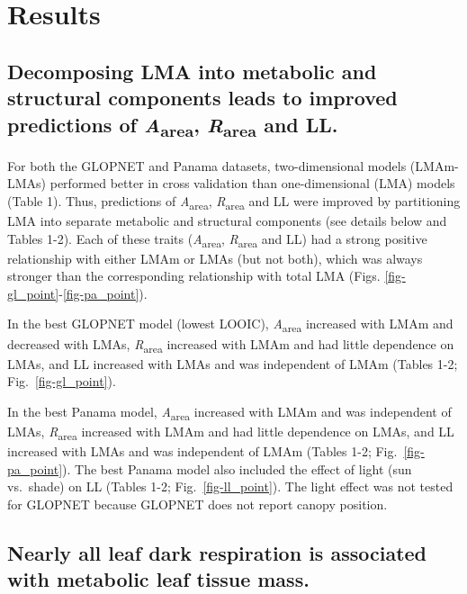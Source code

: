 \documentclass[
  12pt,
  letterpaper,
  DIV=11,
  numbers=noendperiod]{scrartcl}
\begin{document}
\section{Results}\label{results}

\subsection{\texorpdfstring{Decomposing LMA into metabolic and
structural components leads to improved predictions of
\emph{A}\textsubscript{area}, \emph{R}\textsubscript{area} and
LL.}{Decomposing LMA into metabolic and structural components leads to improved predictions of Aarea, Rarea and LL.}}\label{decomposing-lma-into-metabolic-and-structural-components-leads-to-improved-predictions-of-aarea-rarea-and-ll.}

For both the GLOPNET and Panama datasets, two-dimensional models
(LMAm-LMAs) performed better in cross validation than one-dimensional
(LMA) models (Table 1). Thus, predictions of
\emph{A}\textsubscript{area}, \emph{R}\textsubscript{area} and LL were
improved by partitioning LMA into separate metabolic and structural
components (see details below and Tables 1-2). Each of these traits
(\emph{A}\textsubscript{area}, \emph{R}\textsubscript{area} and LL) had
a strong positive relationship with either LMAm or LMAs (but not both),
which was always stronger than the corresponding relationship with total
LMA (Figs. \ref{fig-gl_point}-\ref{fig-pa_point}).

In the best GLOPNET model (lowest LOOIC), \emph{A}\textsubscript{area}
increased with LMAm and decreased with LMAs,
\emph{R}\textsubscript{area} increased with LMAm and had little
dependence on LMAs, and LL increased with LMAs and was independent of
LMAm (Tables 1-2; Fig.~\ref{fig-gl_point}).

In the best Panama model, \emph{A}\textsubscript{area} increased with
LMAm and was independent of LMAs, \emph{R}\textsubscript{area} increased
with LMAm and had little dependence on LMAs, and LL increased with LMAs
and was independent of LMAm (Tables 1-2; Fig.~\ref{fig-pa_point}). The
best Panama model also included the effect of light (sun vs.~shade) on
LL (Tables 1-2; Fig.~\ref{fig-ll_point}). The light effect was not
tested for GLOPNET because GLOPNET does not report canopy position.

\subsection{Nearly all leaf dark respiration is associated with
metabolic leaf tissue
mass.}\label{nearly-all-leaf-dark-respiration-is-associated-with-metabolic-leaf-tissue-mass.}
\end{document}
